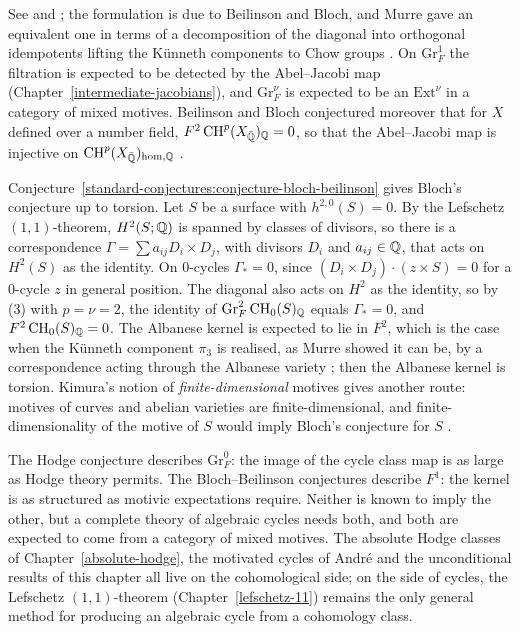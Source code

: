 See \cite{jannsen-1994} and \cite{bloch-lectures}; the formulation is due to Beilinson and Bloch, and Murre gave an equivalent one in terms of a decomposition of the diagonal into orthogonal idempotents
lifting the K\"unneth components to Chow groups \cite{murre-1993}. On $\mathrm{Gr}^1_F$ the filtration is expected to be detected by the Abel--Jacobi map (Chapter~\ref{intermediate-jacobians}), and
$\mathrm{Gr}^\nu_F$ is expected to be an $\mathrm{Ext}^\nu$ in a category of mixed motives. Beilinson and Bloch conjectured moreover that for $X$ defined over a number field, $F^2\operatorname{CH}^p(X_{\bar{\mathbb{Q}}})_{\mathbb{Q}} = 0$,
so that the Abel--Jacobi map is injective on $\operatorname{CH}^p(X_{\bar{\mathbb{Q}}})_{\mathrm{hom},\mathbb{Q}}$ \cite{beilinson-1987}.

\begin{remark}\label{standard-conjectures:remark-bb-bloch}
Conjecture~\ref{standard-conjectures:conjecture-bloch-beilinson} gives Bloch's conjecture up to torsion. Let $S$ be a surface with $h^{2,0}(S) = 0$. By the Lefschetz $(1,1)$-theorem, $H^2(S; \mathbb{Q})$ is spanned by
classes of divisors, so there is a correspondence $\Gamma = \sum a_{ij}D_i \times D_j$, with divisors $D_i$ and $a_{ij} \in \mathbb{Q}$, that acts on $H^2(S)$ as the identity. On $0$-cycles $\Gamma_* = 0$, since
$(D_i \times D_j) \cdot (z \times S) = 0$ for a $0$-cycle $z$ in general position. The diagonal also acts on $H^2$ as the identity, so by (3) with $p = \nu = 2$, the identity of $\mathrm{Gr}^2_F\operatorname{CH}_0(S)_{\mathbb{Q}}$ equals $\Gamma_* = 0$, and
$F^2\operatorname{CH}_0(S)_{\mathbb{Q}} = 0$. The Albanese kernel is expected to lie in $F^2$, which is the case when the K\"unneth component $\pi_3$ is realised, as Murre showed it can be, by a correspondence acting through the
Albanese variety \cite{murre-1993}; then the Albanese kernel is torsion. Kimura's notion of \emph{finite-dimensional} motives gives another route: motives of curves and abelian varieties are
finite-dimensional, and finite-dimensionality of the motive of $S$ would imply Bloch's conjecture for $S$ \cite{kimura-2005}.
\end{remark}

\begin{remark}\label{standard-conjectures:remark-two-halves}
The Hodge conjecture describes $\mathrm{Gr}^0_F$: the image of the cycle class map is as large as Hodge theory permits. The Bloch--Beilinson conjectures describe $F^1$: the kernel is as structured as
motivic expectations require. Neither is known to imply the other, but a complete theory of algebraic cycles needs both, and both are expected to come from a category of mixed motives. The absolute Hodge
classes of Chapter~\ref{absolute-hodge}, the motivated cycles of Andr\'e and the unconditional results of this chapter all live on the cohomological side; on the side of cycles, the Lefschetz $(1,1)$-theorem
(Chapter~\ref{lefschetz-11}) remains the only general method for producing an algebraic cycle from a cohomology class.
\end{remark}

